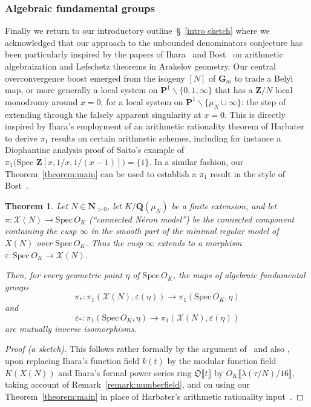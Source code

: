 \documentclass[10pt]{amsart}
\def\NwithoutzeroA{\mathbf{N}_{> 0}}
\def\SSS{\S}
\def\SSSS{\S}
\renewcommand\setminus{\smallsetminus}
\def\spec{\mathrm{Spec} \,}
\def\Z{\mathbf{Z}}
\def\Q{\mathbf{Q}}
\renewcommand\mathbb{\mathbf}
\newtheorem{theorem}[subsubsection]{Theorem}
\theoremstyle{remark}
\numberwithin{equation}{subsection}
\begin{document}
\subsubsection{Algebraic fundamental groups} 
Finally we return to our introductory outline~\SSSS~\ref{intro sketch} where we acknowledged that our approach to the unbounded denominators conjecture has been  particularly inspired by the papers of Ihara~\cite{Ihara} and Bost~\cite{Bost} on arithmetic algebraization and Lefschetz theorems
in Arakelov geometry. Our central overconvergence boost emerged from the isogeny $[N]$ of $\mathbb{G}_m$ to trade a Bely\u{\i} map, or more
generally a local system on $\mathbb{P}^1 \setminus \{0, 1, \infty\}$ that has a $\Z/N$ local monodromy around $x = 0$, for a local system on $\mathbb{P}^1 \setminus \{\mu_N \cup \infty\}$:  the step of
extending through the falsely apparent singularity at $ x = 0$.   This is directly inspired by Ihara's employment of an arithmetic rationality theorem 
of Harbater~\cite[\SSS~1~Lemma]{Ihara} to derive $\pi_1$ results on certain arithmetic schemes, including for instance a Diophantine analysis proof of Saito's example of
$\pi_1 \big( \spec \, \Z[x, 1/x, 1/(x-1)] \big) = \{1\}$. In a similar fashion,
our Theorem~\ref{theorem:main} can be used to establish a $\pi_1$ result
in the style of Bost~\cite{Bost}. 


\begin{theorem}  \label{pi1}
Let $N \in \NwithoutzeroA$, let $K /\Q(\mu_N)$ be a finite extension, and let  $\pi: \mathcal{X}(N) \to \spec{O_K}$ (``connected N\'eron model'') be the connected component containing the cusp $\infty$ in the smooth part of the minimal regular model of $X(N)$ over $\spec{O_K}$.  Thus the cusp $\infty$ extends to a morphism  $\varepsilon : \spec{O_K} \to \mathcal{X}(N)$. 

  Then, for every geometric point $\eta$ of $\spec{O_K}$, the maps of algebraic fundamental groups
$$
\pi_* : \pi_1(\mathcal{X}(N), \varepsilon(\eta))  \to \pi_1(\spec{O_K}, \eta)
$$
and
$$
\varepsilon_* :    \pi_1(\spec{O_K}, \eta)   \to  \pi_1(\mathcal{X}(N), \varepsilon(\eta))
$$
are mutually inverse isomorphisms. 
\end{theorem}

\begin{proof}[Proof (a sketch)]
This follows rather formally by the argument of~\cite[\SSS~4 on page 252]{Ihara} and also  \cite[proof of Theorem~1 \emph{loc.cit.} on pages~248--249]{Ihara}, upon replacing Ihara's  function field $k(t)$  by the modular function field~$K(X(N))$ and Ihara's formal power series ring $\mathfrak{O}\llbracket t \rrbracket$ by $O_K\llbracket \lambda(\tau/N)/16 \rrbracket$, taking account of Remark~\ref{remark:numberfield},
  and on using our Theorem~\ref{theorem:main} in place of Harbater's arithmetic rationality input~\cite[Claim~1A on page 248]{Ihara}.  
  \end{proof}
\end{document}

